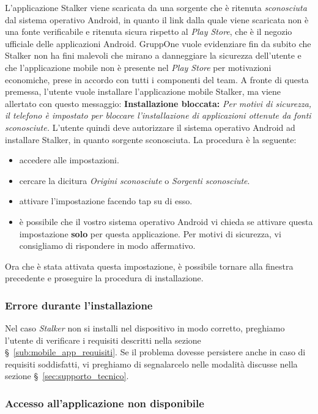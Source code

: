\documentclass[../manuale-utente.tex]{subfiles}
\begin{document}
L'applicazione Stalker viene scaricata da una sorgente che è ritenuta \textit{sconosciuta} dal sistema operativo Android, in quanto il link dalla quale viene scaricata non è una fonte verificabile e ritenuta sicura rispetto al \textit{Play Store}, che è il negozio ufficiale delle applicazioni Android.
GruppOne vuole evidenziare fin da subito che Stalker non ha fini malevoli che mirano a danneggiare la sicurezza dell'utente e che l'applicazione mobile non è presente nel \textit{Play Store} per motivazioni economiche, prese in accordo con tutti i componenti del team.
A fronte di questa premessa, l'utente vuole installare l'applicazione mobile Stalker, ma viene allertato con questo messaggio:
\textbf{Installazione bloccata:} \textit{Per motivi di sicurezza, il telefono è impostato per bloccare l’installazione di applicazioni ottenute da fonti sconosciute.}
L'utente quindi deve autorizzare il sistema operativo Android ad installare Stalker, in quanto sorgente sconosciuta. La procedura è la seguente:
\begin{itemize}
    \item accedere alle impostazioni.
    \item cercare la dicitura \textit{Origini sconosciute} o \textit{Sorgenti sconosciute}.
    \item attivare l'impostazione facendo tap su di esso.
    \item è possibile che il vostro sistema operativo Android vi chieda se attivare questa impostazione \textbf{solo} per questa applicazione. Per motivi di sicurezza, vi consigliamo di rispondere in modo affermativo.
\end{itemize}
Ora che è stata attivata questa impostazione, è possibile tornare alla finestra precedente e proseguire la procedura di installazione.

\subsubsection{Errore durante l'installazione}%
\label{subs:mobile_app_errore_installazione}

Nel caso \textit{Stalker} non si installi nel dispositivo in modo corretto, preghiamo l'utente di verificare i requisiti descritti nella sezione §~\ref{sub:mobile_app_requisiti}.
Se il problema dovesse persistere anche in caso di requisiti soddisfatti, vi preghiamo di segnalarcelo nelle modalità discusse nella sezione §~\ref{sec:supporto_tecnico}.

\subsubsection{Accesso all'applicazione non disponibile}%
\label{subs:mobile_app_accesso_non_disponibile}
\end{document}

